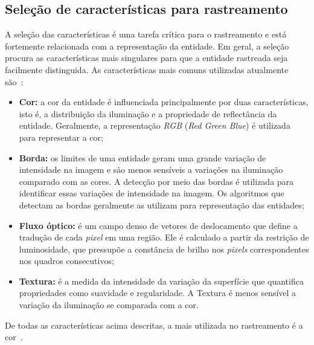 
\subsection{Seleção de características para rastreamento}

	A seleção das características é uma tarefa crítica para o rastreamento e está fortemente relacionada com a representação da entidade. Em geral, a seleção procura as características mais singulares para que a entidade rastreada seja facilmente distinguida. As características mais comuns utilizadas atualmente são~\cite{yilmaz, horn}:

	\begin{itemize}
		\item \textbf{Cor:} a cor da entidade é influenciada principalmente por duas
		características, isto é, a distribuição da iluminação e a propriedade de reflectância da
		entidade. Geralmente, a representação \textit{RGB} (\textit{Red Green Blue}) é utilizada para representar
		a cor;

		\item \textbf{Borda:} os limites de uma entidade geram uma grande variação de
		intensidade na imagem e são menos sensíveis a variações na iluminação comparado
		com as cores. A detecção por meio das bordas é utilizada para identificar essas
		variações de intensidade na imagem. Os algoritmos que detectam as bordas
		geralmente as utilizam para representação das entidades;

		\item \textbf{Fluxo óptico:} é um campo denso de vetores de deslocamento que
		define a tradução de cada \textit{pixel} em uma região. Ele é calculado a
		partir da restrição de luminosidade, que pressupõe a constância de brilho nos
		\textit{pixels} correspondentes nos quadros consecutivos;

		\item \textbf{Textura:} é a medida da intensidade da variação da superfície que
		quantifica propriedades como suavidade e regularidade. A Textura é menos
		sensível a variação da iluminação se comparada com a cor.

	\end{itemize}

De todas as características acima descritas, a mais utilizada no rastreamento é a cor~\cite{yilmaz}.


